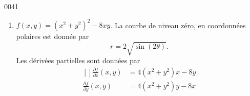 \begin{corrige}{0041}
\begin{enumerate}
\item
$f(x,y)=(x^2+y^2)^2-8xy$. La courbe de niveau zéro, en coordonnées polaires est donnée par
\begin{equation}
	r=2\sqrt{\sin(2\theta)}.
\end{equation}
Les dérivées partielles sont données par
\begin{equation}
	\begin{aligned}[]
		\frac{ \partial f }{ \partial x }(x,y)	&=4(x^2+y^2)x-8y\\
		\frac{ \partial f }{ \partial y }(x,y)	&=4(x^2+y^2)y-8x
	\end{aligned}
\end{equation}

\end{enumerate}

\end{corrige}
